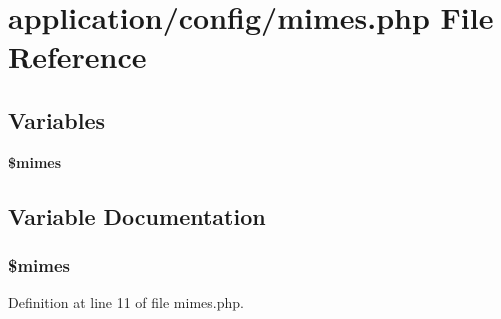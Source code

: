 \section{application/config/mimes.php File Reference}
\label{mimes_8php}
\subsection*{Variables}
\begin{DoxyCompactItemize}
\item 
{\bf \$mimes}
\end{DoxyCompactItemize}


\subsection{Variable Documentation}
\subsubsection[{\$mimes}]{\setlength{\rightskip}{0pt plus 5cm}\$mimes}\label{mimes_8php_a2ce7d338d1fd0f0d971ba6213ac298a2}


Definition at line 11 of file mimes.\-php.

